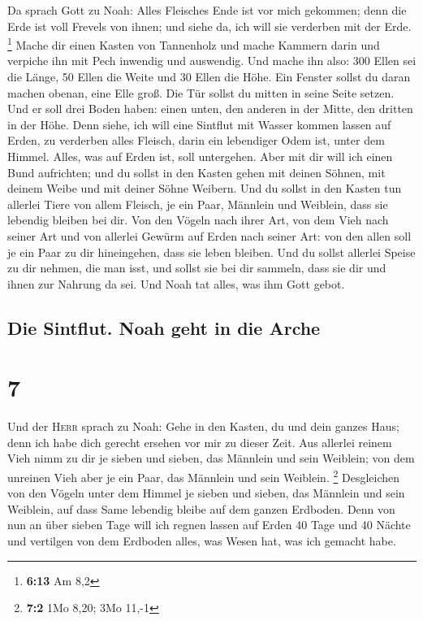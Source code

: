  Da sprach Gott zu Noah: Alles Fleisches Ende ist vor
mich gekommen; denn die Erde ist voll Frevels von ihnen; und siehe da,
ich will sie verderben mit der Erde. \footnote{\textbf{6:13} Am 8,2}
 Mache dir einen Kasten von Tannenholz und mache Kammern
darin und verpiche ihn mit Pech inwendig und auswendig. 
Und mache ihn also: 300 Ellen sei die Länge, 50 Ellen die Weite und 30
Ellen die Höhe.  Ein Fenster sollst du daran machen
obenan, eine Elle groß. Die Tür sollst du mitten in seine Seite setzen.
Und er soll drei Boden haben: einen unten, den anderen in der Mitte, den
dritten in der Höhe.  Denn siehe, ich will eine Sintflut
mit Wasser kommen lassen auf Erden, zu verderben alles Fleisch, darin
ein lebendiger Odem ist, unter dem Himmel. Alles, was auf Erden ist,
soll untergehen.  Aber mit dir will ich einen Bund
aufrichten; und du sollst in den Kasten gehen mit deinen Söhnen, mit
deinem Weibe und mit deiner Söhne Weibern.  Und du sollst
in den Kasten tun allerlei Tiere von allem Fleisch, je ein Paar,
Männlein und Weiblein, dass sie lebendig bleiben bei dir.
 Von den Vögeln nach ihrer Art, von dem Vieh nach seiner
Art und von allerlei Gewürm auf Erden nach seiner Art: von den allen
soll je ein Paar zu dir hineingehen, dass sie leben bleiben.
 Und du sollst allerlei Speise zu dir nehmen, die man
isst, und sollst sie bei dir sammeln, dass sie dir und ihnen zur Nahrung
da sei.  Und Noah tat alles, was ihm Gott gebot.

\hypertarget{die-sintflut.-noah-geht-in-die-arche}{%
\subsection{Die Sintflut. Noah geht in die
Arche}\label{die-sintflut.-noah-geht-in-die-arche}}

\hypertarget{section-6}{%
\section{7}\label{section-6}}

 Und der \textsc{Herr} sprach zu Noah: Gehe in den Kasten,
du und dein ganzes Haus; denn ich habe dich gerecht ersehen vor mir zu
dieser Zeit.  Aus allerlei reinem Vieh nimm zu dir je
sieben und sieben, das Männlein und sein Weiblein; von dem unreinen Vieh
aber je ein Paar, das Männlein und sein Weiblein. \footnote{\textbf{7:2}
  1Mo 8,20; 3Mo 11,-1}  Desgleichen von den Vögeln unter
dem Himmel je sieben und sieben, das Männlein und sein Weiblein, auf
dass Same lebendig bleibe auf dem ganzen Erdboden.  Denn
von nun an über sieben Tage will ich regnen lassen auf Erden 40 Tage und
40 Nächte und vertilgen von dem Erdboden alles, was Wesen hat, was ich
gemacht habe.

